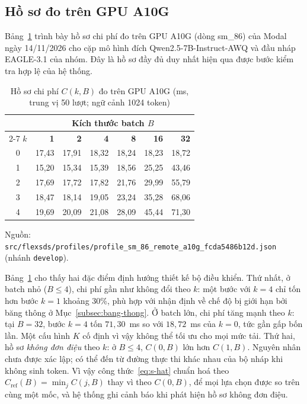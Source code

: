 \subsection{Hồ sơ đo trên GPU A10G}

Bảng~\ref{tab:ho-so-a10g} trình bày hồ sơ chi phí đo trên GPU A10G (dòng sm\_86) của Modal ngày 14/11/2026 cho cặp mô hình đích Qwen2.5-7B-Instruct-AWQ và đầu nháp EAGLE-3.1 của nhóm. Đây là hồ sơ đầy đủ duy nhất hiện qua được bước kiểm tra hợp lệ của hệ thống.

\begin{table}[htbp]
\centering
\caption{Hồ sơ chi phí $C(k,B)$ đo trên GPU A10G (ms, trung vị 50 lượt; ngữ cảnh 1024 token)}
\label{tab:ho-so-a10g}
\small
\begin{tabular}{@{}crrrrrr@{}}
\toprule
 & \multicolumn{6}{c}{\textbf{Kích thước batch $B$}} \\
\cmidrule(l){2-7}
\textbf{$k$} & \textbf{1} & \textbf{2} & \textbf{4} & \textbf{8} & \textbf{16} & \textbf{32} \\
\midrule
0 & 17,43 & 17,91 & 18,32 & 18,24 & 18,23 & 18,72 \\
1 & 15,20 & 15,34 & 15,39 & 18,56 & 25,25 & 43,46 \\
2 & 17,69 & 17,72 & 17,82 & 21,76 & 29,99 & 55,79 \\
3 & 18,47 & 18,14 & 19,05 & 23,24 & 35,28 & 68,06 \\
4 & 19,69 & 20,09 & 21,08 & 28,09 & 45,44 & 71,30 \\
\bottomrule
\end{tabular}

\vspace{2pt}
{\footnotesize Nguồn: \texttt{src/flexsds/profiles/profile\_sm\_86\_remote\_a10g\_fcda5486b12d.json} (nhánh \texttt{develop}).}
\end{table}

Bảng~\ref{tab:ho-so-a10g} cho thấy hai đặc điểm định hướng thiết kế bộ điều khiển. Thứ nhất, ở batch nhỏ ($B \le 4$), chi phí gần như không đổi theo $k$: một bước với $k=4$ chỉ tốn hơn bước $k=1$ khoảng 30\%, phù hợp với nhận định về chế độ bị giới hạn bởi băng thông ở Mục~\ref{subsec:bang-thong}. Ở batch lớn, chi phí tăng mạnh theo $k$: tại $B=32$, bước $k=4$ tốn $71{,}30$~ms so với $18{,}72$~ms của $k=0$, tức gần gấp bốn lần. Một cấu hình $K$ cố định vì vậy không thể tối ưu cho mọi mức tải. Thứ hai, hồ sơ \emph{không đơn điệu} theo $k$: ở $B \le 4$, $C(0, B)$ lớn hơn $C(1, B)$. Nguyên nhân chưa được xác lập; có thể đến từ đường thực thi khác nhau của bộ nháp khi không sinh token. Vì vậy công thức~\eqref{eq:s-hat} chuẩn hoá theo $C_{\text{ref}}(B) = \min_j C(j, B)$ thay vì theo $C(0, B)$, để mọi lựa chọn được so trên cùng một mốc, và hệ thống ghi cảnh báo khi phát hiện hồ sơ không đơn điệu.

